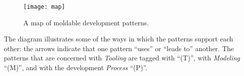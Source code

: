 \documentclass[acmsmall,screen,authorversion,nonacm]{acmart} %
\newcommand\kh[1]{\nbc{Konrad}{#1}{violet}}
\newcommand\eog[1]{\nbc{Edward}{#1}{purple}}
\newcommand\cp[1]{\nbe{Cesare}{#1}{olive}} %
\newcommand\ws[1]{\nbe{Workshop}{#1}{teal}} %
\begin{document}
\begin{figure}[h]
  \texttt{[image: map]}
  \caption{A map of moldable development patterns.
  }
  \label{fig:map}
\end{figure}





The diagram illustrates some of the ways in which the patterns support each other:
the arrows indicate that one pattern ``uses'' or ``leads to'' another.
The patterns that are concerned with \emph{Tooling} are tagged with ``(T)'', with \emph{Modeling} ``(M)'', and with the development \emph{Process} ``(P)''.
\end{document}
